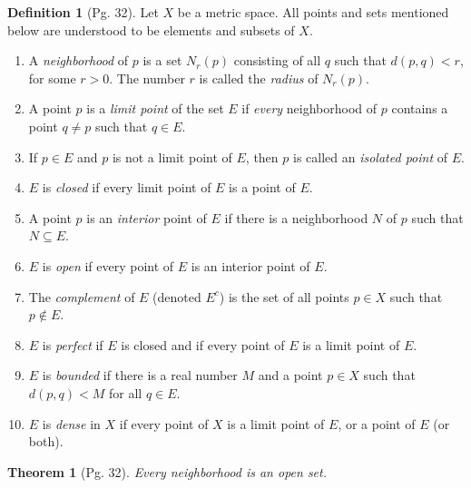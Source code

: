 \documentclass[leqno]{article}
\newtheorem{theorem}{Theorem}[section]
\theoremstyle{definition}
\newtheorem{definition}{Definition}[section]
\theoremstyle{remark}
\begin{document}
            \begin{definition}[Pg. 32]\label{def:5.5}
                Let $X$ be a metric space. All points and sets mentioned below are understood to be elements and subsets of $X$.
                    \begin{enumerate}[label=(\alph*)]
                        \item A \emph{neighborhood} of $p$ is a set $N_r(p)$ consisting of all $q$ such that $d(p,q)<r$, for some $r>0$. The number $r$ is called the \emph{radius} of $N_r(p)$.
                        \item A point $p$ is a \emph{limit point} of the set $E$ if \emph{every} neighborhood of $p$ contains a point $q\neq p$ such that $q\in E$.
                        \item If $p\in E$ and $p$ is not a limit point of $E$, then $p$ is called an \emph{isolated point} of $E$.
                        \item $E$ is \emph{closed} if every limit point of $E$ is a point of $E$.
                        \item A point $p$ is an \emph{interior} point of $E$ if there is a neighborhood $N$ of $p$ such that $N\subseteq E$.
                        \item $E$ is \emph{open} if every point of $E$ is an interior point of $E$.
                        \item The \emph{complement} of $E$ (denoted $E^c$) is the set of all points $p\in X$ such that $p\notin E$.
                        \item $E$ is \emph{perfect} if $E$ is closed and if every point of $E$ is a limit point of $E$. 
                        \item $E$ is \emph{bounded} if there is a real number $M$ and a point $p\in X$ such that $d(p,q)<M$ for all $q\in E$.
                        \item $E$ is \emph{dense} in $X$ if every point of $X$ is a limit point of $E$, or a point of $E$ (or both). \cite{rud}
                    \end{enumerate}
            \end{definition}
            \begin{theorem}[Pg. 32]\label{thm:5.1}
                Every neighborhood is an open set. 
            \end{theorem}
\end{document}
